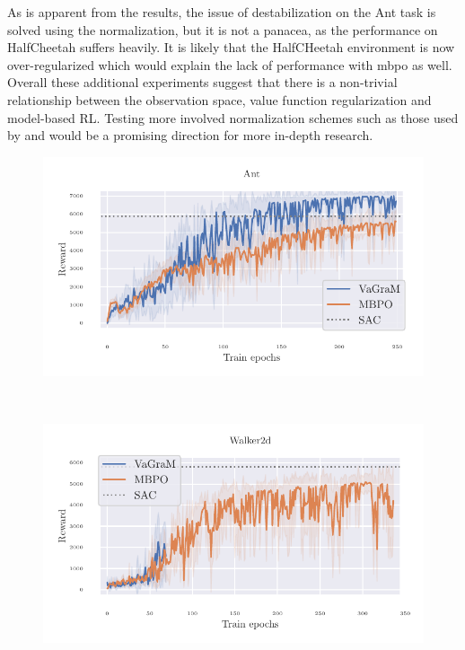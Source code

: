 As is apparent from the results, the issue of destabilization on the Ant task is solved using the normalization, but it is not a panacea, as the performance on HalfCheetah suffers heavily. 
It is likely that the HalfCHeetah environment is now over-regularized which would explain the lack of performance with \ac{mbpo} as well. Overall these additional experiments suggest that there is a non-trivial relationship between the observation space, value function regularization and model-based RL. 
Testing more involved normalization schemes such as those used by \textcite{bjorck2021towards} and \textcite{zheng2023is} would be a promising direction for more in-depth research.

\begin{figure}[t]
\begin{center}
\begin{minipage}{.49\textwidth}
    \centering
    \includegraphics[width=\textwidth]{figures/vagram/ant.pdf}
\end{minipage}~
\begin{minipage}{.49\textwidth}
    \centering
    \includegraphics[width=\textwidth]{figures/vagram/walker.pdf}
\end{minipage}
\end{center}


\end{figure}
